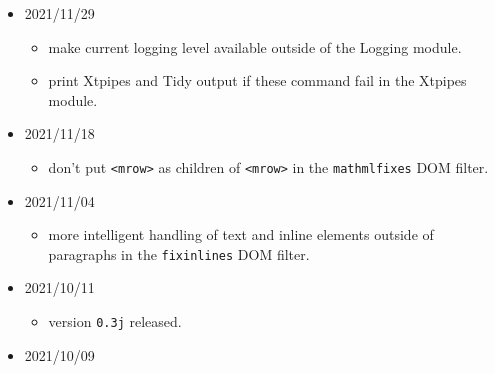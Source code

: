 \begin{itemize}
  \begin{itemize}
  \tightlist
  \item
    transform
    \texttt{\textless{}mn\textgreater{}x\textless{}/mn\textgreater{}\textless{}mo\textgreater{}.\textless{}/mo\textgreater{}\textless{}mn\textgreater{}x\textless{}/mn\textgreater{}}
    to
    \texttt{\textless{}mn\textgreater{}x.x\textless{}/mn\textgreater{}}
    in MathML.
  \item
    transform \texttt{\textless{}mo\textgreater{}} elements that are
    single childs to \texttt{\textless{}mi\textgreater{}} in MathML, and
    list of consecutive \texttt{\textless{}mo\textgreater{}} elements to
    \texttt{\textless{}mtext\textgreater{}}. This should fix rendering
    issues of superscripts in LibreOffice.
  \item
    added filter names in extensions to prevent multiple execution of
    filters.
  \end{itemize}
\item
  2021/11/29

  \begin{itemize}
  \tightlist
  \item
    make current logging level available outside of the Logging module.
  \item
    print Xtpipes and Tidy output if these command fail in the Xtpipes
    module.
  \end{itemize}
\item
  2021/11/18

  \begin{itemize}
  \tightlist
  \item
    don't put \texttt{\textless{}mrow\textgreater{}} as children of
    \texttt{\textless{}mrow\textgreater{}} in the \texttt{mathmlfixes}
    DOM filter.
  \end{itemize}
\item
  2021/11/04

  \begin{itemize}
  \tightlist
  \item
    more intelligent handling of text and inline elements outside of
    paragraphs in the \texttt{fixinlines} DOM filter.
  \end{itemize}
\item
  2021/10/11

  \begin{itemize}
  \tightlist
  \item
    version \texttt{0.3j} released.
  \end{itemize}
\item
  2021/10/09


\end{itemize}
